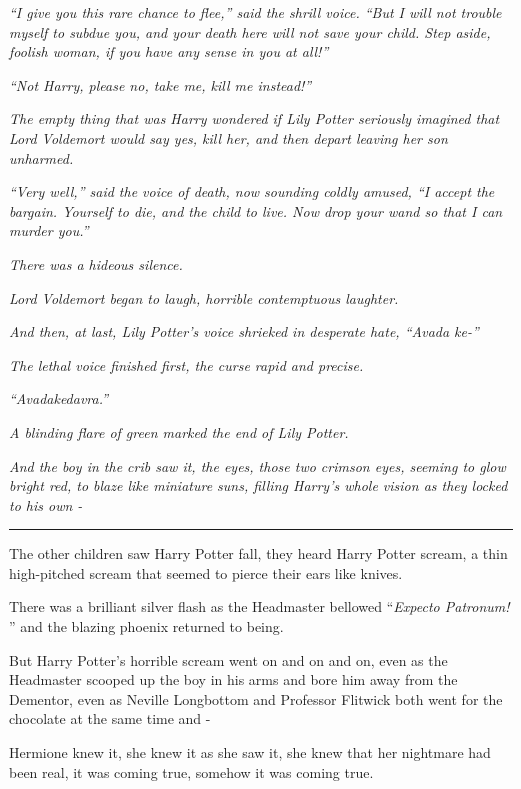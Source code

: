\emph{``I give you this rare chance to flee,'' said the shrill voice.
``But I will not trouble myself to subdue you, and your death here will
not save your child. Step aside, foolish woman, if you have any sense in
you at all!''}

\emph{``Not Harry, please no, take me, kill me instead!''}

\emph{The empty thing that was Harry wondered if Lily Potter seriously
imagined that Lord Voldemort would say yes, kill her, and then depart
leaving her son unharmed.}

\emph{``Very well,'' said the voice of death, now sounding coldly
amused, ``I accept the bargain. Yourself to die, and the child to live.
Now drop your wand so that I can murder you.''}

\emph{There was a hideous silence.}

\emph{Lord Voldemort began to laugh, horrible contemptuous laughter.}

\emph{And then, at last, Lily Potter's voice shrieked in desperate hate,
``Avada ke-''}

\emph{The lethal voice finished first, the curse rapid and precise.}

\emph{``Avadakedavra.''}

\emph{A blinding flare of green marked the end of Lily Potter.}

\emph{And the boy in the crib saw it, the eyes, those two crimson eyes,
seeming to glow bright red, to blaze like miniature suns, filling
Harry's whole vision as they locked to his own -}

\begin{center}\rule{3in}{0.4pt}\end{center}

The other children saw Harry Potter fall, they heard Harry Potter
scream, a thin high-pitched scream that seemed to pierce their ears like
knives.

There was a brilliant silver flash as the Headmaster bellowed
``\emph{Expecto Patronum!} '' and the blazing phoenix returned to being.

But Harry Potter's horrible scream went on and on and on, even as the
Headmaster scooped up the boy in his arms and bore him away from the
Dementor, even as Neville Longbottom and Professor Flitwick both went
for the chocolate at the same time and -

Hermione knew it, she knew it as she saw it, she knew that her nightmare
had been real, it was coming true, somehow it was coming true.

